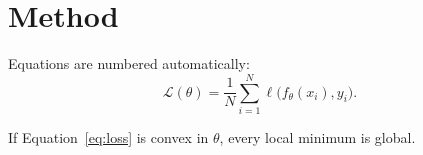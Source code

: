 \section{Method}
\label{sec:method}

Equations are numbered automatically:
\begin{equation}
  \mathcal{L}(\theta) = \frac{1}{N}\sum_{i=1}^{N} \ell\bigl(f_\theta(x_i), y_i\bigr).
  \label{eq:loss}
\end{equation}

\begin{theorem}
If Equation~\eqref{eq:loss} is convex in $\theta$, every local minimum is global.
\end{theorem}
